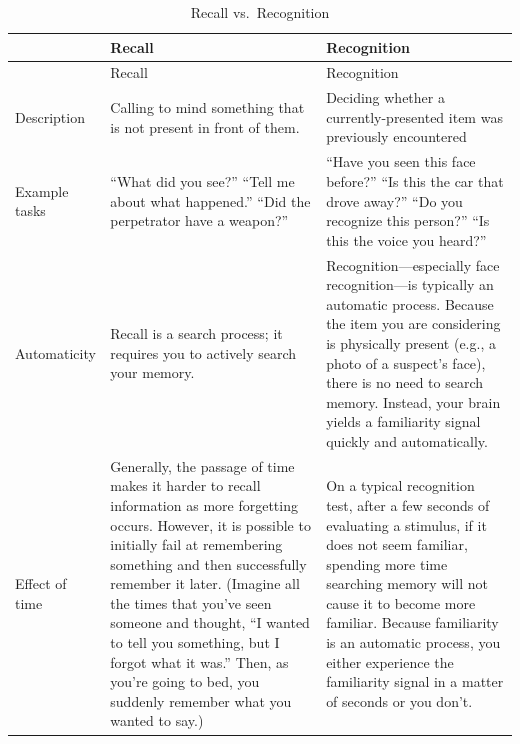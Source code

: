 \documentclass[
]{krantz}
\begin{document}
\begin{longtable}[]{@{}
  >{\raggedright\arraybackslash}p{}
  >{\raggedright\arraybackslash}p{}
  >{\raggedright\arraybackslash}p{}@{}}
\caption{\label{tab:recallrecognition} Recall vs.~Recognition}\tabularnewline
\toprule\noalign{}
\begin{minipage}[b]{\linewidth}\raggedright
\end{minipage} & \begin{minipage}[b]{\linewidth}\raggedright
Recall
\end{minipage} & \begin{minipage}[b]{\linewidth}\raggedright
Recognition
\end{minipage} \\
\midrule\noalign{}
\endfirsthead
\toprule\noalign{}
\begin{minipage}[b]{\linewidth}\raggedright
\end{minipage} & \begin{minipage}[b]{\linewidth}\raggedright
Recall
\end{minipage} & \begin{minipage}[b]{\linewidth}\raggedright
Recognition
\end{minipage} \\
\midrule\noalign{}
\endhead
\bottomrule\noalign{}
\endlastfoot
Description & Calling to mind something that is not present in front of them. & Deciding whether a currently-presented item was previously encountered \\
Example tasks & ``What did you see?'' ``Tell me about what happened.'' ``Did the perpetrator have a weapon?'' & ``Have you seen this face before?'' ``Is this the car that drove away?'' ``Do you recognize this person?'' ``Is this the voice you heard?'' \\
Automaticity & Recall is a search process; it requires you to actively search your memory. & Recognition---especially face recognition---is typically an automatic process. Because the item you are considering is physically present (e.g., a photo of a suspect's face), there is no need to search memory. Instead, your brain yields a familiarity signal quickly and automatically. \\
Effect of time & Generally, the passage of time makes it harder to recall information as more forgetting occurs. However, it is possible to initially fail at remembering something and then successfully remember it later. (Imagine all the times that you've seen someone and thought, ``I wanted to tell you something, but I forgot what it was.'' Then, as you're going to bed, you suddenly remember what you wanted to say.) & On a typical recognition test, after a few seconds of evaluating a stimulus, if it does not seem familiar, spending more time searching memory will not cause it to become more familiar. Because familiarity is an automatic process, you either experience the familiarity signal in a matter of seconds or you don't. \\
\end{longtable}
\end{document}
